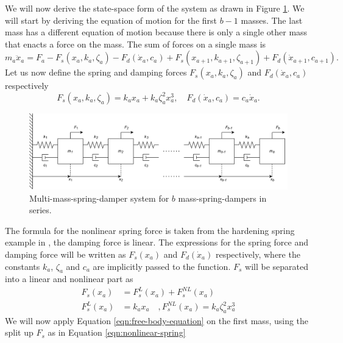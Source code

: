 We will now derive the state-space form of the system as drawn in Figure \ref{fig:mass-spring-damper-system-series}. We will start by deriving the equation of motion for the first $b-1$ masses. The last mass has a different equation of motion because there is only a single other mass that enacts a force on the mass. The sum of forces on a single mass is
\begin{equation}\label{eqn:free-body-equation}
    m_a\ddot{x}_a = F_a - F_s(x_a,k_a,\zeta_a) - F_d(\dot{x}_a,c_a) + F_s(x_{a+1},k_{a+1},\zeta_{a+1}) + F_d(\dot{x}_{a+1},c_{a+1}).
\end{equation}
Let us now define the spring and damping forces $F_s(x_a,k_a,\zeta_a)$ and $F_d(\dot{x}_a,c_a)$ respectively
\begin{equation*}
    F_s(x_a,k_a,\zeta_a) = k_ax_a + k_a \zeta_a^2 x_a^3, \quad F_d(\dot{x}_a,c_a) = c_a\dot{x}_a.
\end{equation*}
\begin{figure}[H]
    \centering
    \includegraphics[width=0.9\linewidth]{report/Figures/Mass-spring-damper system.png}
    \caption{Multi-mass-spring-damper system for $b$ mass-spring-dampers in series.}
    \label{fig:mass-spring-damper-system-series}
\end{figure}
The formula for the nonlinear spring force is taken from the hardening spring example in \cite[Section 1.2.3]{Khalil2002NonlinearSystems}, the damping force is linear. The expressions for the spring force and damping force will be written as $F_s(x_a)$ and $F_d(\dot{x}_a)$ respectively, where the constants $k_a$, $\zeta_a$ and $c_a$ are implicitly passed to the function. $F_s$ will be separated into a linear and nonlinear part as
\begin{equation}\label{eqn:nonlinear-spring}
    \begin{split}
        F_s(x_a) &= F_s^L(x_a) + F_s^{NL}(x_a) \\
        F_s^L(x_a) &= k_ax_a \quad , F_s^{NL}(x_a) = k_a\zeta_a^2x^3_a
    \end{split}    
\end{equation}
We will now apply Equation \eqref{eqn:free-body-equation} on the first mass, using the split up $F_s$ as in Equation \eqref{eqn:nonlinear-spring}
